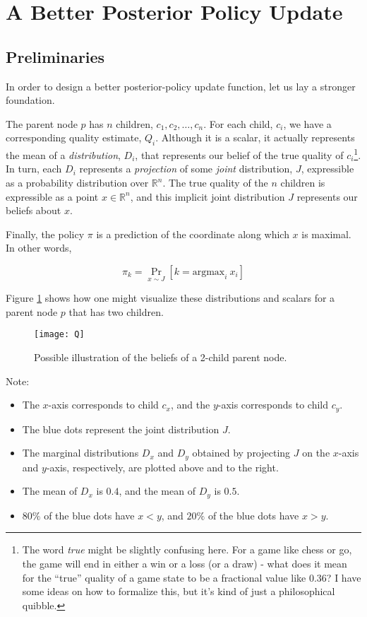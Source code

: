 \documentclass[tikz]{article}
\newcommand{\argmax}{\mathrm{argmax}}
\begin{document}
\section{A Better Posterior Policy Update}

\subsection{Preliminaries}

In order to design a better posterior-policy update function, let us lay a stronger foundation. \newline

The parent node $p$ has $n$ children, $c_1, c_2, \ldots, c_n$. For each child, $c_i$, we have a corresponding
quality estimate, $Q_i$.
Although it is a scalar, it actually represents the mean of a \emph{distribution}, $D_i$, that represents our belief of the
true quality of $c_i$\footnote{The word \emph{true} might be slightly confusing here. For a game like chess or go, the game will
end in either a win or a loss (or a draw) - what does it mean for the ``true'' quality of a game state to be a fractional value like 0.36?
I have some ideas on how to formalize this, but it's kind of just a philosophical quibble.}.
In turn, each $D_i$ represents a \emph{projection} of some \emph{joint} distribution, $J$, expressible as
a probability distribution over $\mathbb{R}^n$. The true quality of the $n$ children is expressible as a point $x \in \mathbb{R}^n$,
and this implicit joint distribution $J$ represents our beliefs about $x$.\newline

Finally, the policy $\pi$ is a prediction of the coordinate along which $x$ is maximal. In other words,

$$
\pi_k = \Pr_{x \sim J}[k = \argmax_i\ x_i]
$$

Figure \ref{Q-figure} shows how one might visualize these distributions and scalars for a parent node $p$ that has two children. 

\begin{figure}[h]
\caption{Possible illustration of the beliefs of a 2-child parent node.}
\label{Q-figure}
\centering
\texttt{[image: Q]}
\end{figure}

\newpage 

Note:

\begin{itemize}
    \item The $x$-axis corresponds to child $c_x$, and the $y$-axis corresponds to child $c_y$.
    \item The blue dots represent the joint distribution $J$.
    \item The marginal distributions $D_x$ and $D_y$ obtained by projecting $J$ on the $x$-axis and $y$-axis, respectively, are plotted above and to the right.
    \item The mean of $D_x$ is $0.4$, and the mean of $D_y$ is $0.5$.
    \item $80\%$ of the blue dots have $x<y$, and $20\%$ of the blue dots have $x>y$.
\end{itemize}
\end{document}
